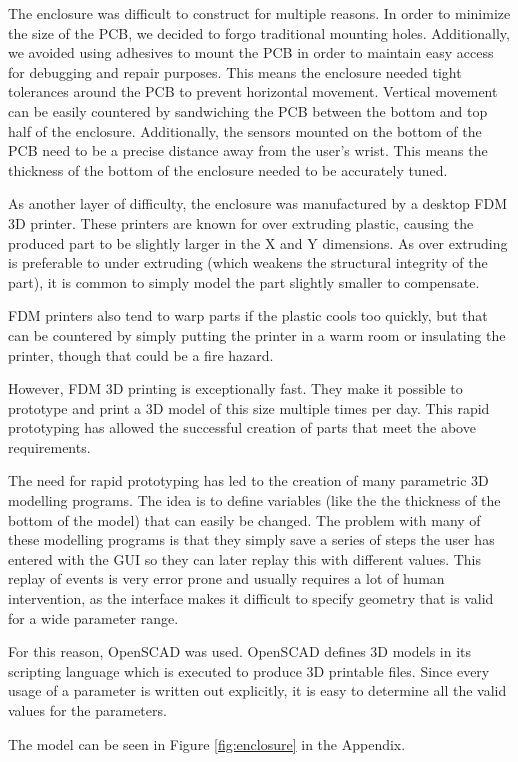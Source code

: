 
The enclosure was difficult to construct for multiple reasons.  In order to
minimize the size of the PCB, we decided to forgo traditional mounting holes.
Additionally, we avoided using adhesives to mount the PCB in order to maintain
easy access for debugging and repair purposes.  This means the enclosure needed
tight tolerances around the PCB to prevent horizontal movement.  Vertical
movement can be easily countered by sandwiching the PCB between the bottom and
top half of the enclosure.  Additionally, the sensors mounted on the bottom of
the PCB need to be a precise distance away from the user’s wrist.  This means
the thickness of the bottom of the enclosure needed to be accurately tuned.

As another layer of difficulty, the enclosure was manufactured by a desktop FDM 3D printer.  
These printers are known for over extruding plastic, causing the produced part to be slightly larger in the X and Y
dimensions.  As over extruding is preferable to under extruding (which weakens
the structural integrity of the part), it is common to simply model the part
slightly smaller to compensate.

FDM printers also tend to warp parts if the plastic cools too quickly, but that
can be countered by simply putting the printer in a warm room or insulating the
printer, though that could be a fire hazard.

However, FDM 3D printing is exceptionally fast.  They make it possible to
prototype and print a 3D model of this size multiple times per day.  This rapid
prototyping has allowed the successful creation of parts that meet the above requirements.

The need for rapid prototyping has led to the creation of many parametric 3D
modelling programs.  The idea is to define variables (like the the thickness of
the bottom of the model) that can easily be changed.  The problem with many of
these modelling programs is that they simply save a series of steps the user has
entered with the GUI so they can later replay this with different values.  This
replay of events is very error prone and usually requires a lot of human
intervention, as the interface makes it difficult to specify
geometry that is valid for a wide parameter range.

For this reason, OpenSCAD was used.  OpenSCAD defines 3D models in its
scripting language which is executed to produce 3D printable files.  Since
every usage of a parameter is written out explicitly, it is easy to determine
all the valid values for the parameters.

The model can be seen in Figure \ref{fig:enclosure} in the Appendix.

